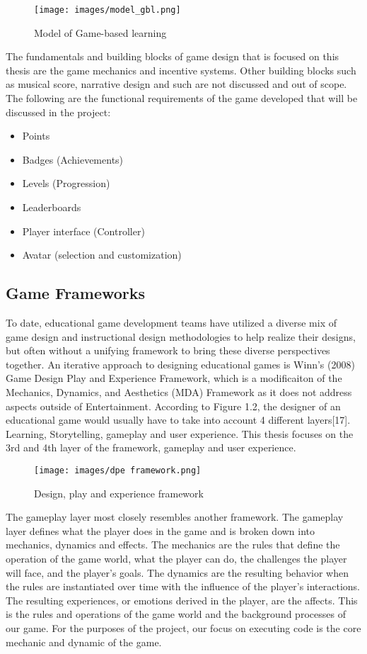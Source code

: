 \begin{figure}[H]
    \centering
    \texttt{[image: images/model\_gbl.png]}
    \caption{Model of Game-based learning}
    \label{fig:model_GBL}
\end{figure}
The fundamentals and building blocks of game design that is focused on this thesis are the game mechanics and incentive systems. Other building blocks such as musical score, narrative design and such are not discussed and out of scope. The following are the functional requirements of the game developed that will be discussed in the project:
\begin{itemize}
    \item Points
    \item Badges (Achievements)
    \item Levels (Progression)
    \item Leaderboards
    \item Player interface (Controller)
    \item Avatar (selection and customization)
\end{itemize}

\subsection{Game Frameworks}
To date, educational game development teams have utilized a diverse mix of game design and instructional design methodologies to help realize their designs, but often without a unifying framework to bring these diverse perspectives together. An iterative approach to designing educational games is Winn's (2008) Game Design Play and Experience Framework, which is a modificaiton of the Mechanics, Dynamics, and Aesthetics (MDA) Framework as it does not address aspects outside of Entertainment. According to Figure 1.2, the designer of an educational game would usually have to take into account 4 different layers[17]. Learning, Storytelling, gameplay and user experience. This thesis focuses on the 3rd and 4th layer of the framework, gameplay and user experience.

\begin{figure}[H]
    \centering
    \texttt{[image: images/dpe framework.png]}
    \caption{Design, play and experience framework}
\end{figure}


The gameplay layer most closely resembles another framework. The gameplay layer defines what the player does in the game and is broken down into mechanics, dynamics and effects. The mechanics are the rules that define the operation of the game world, what the player can do, the challenges the player will face, and the player's goals. The dynamics are the resulting behavior when the rules are instantiated over time with the influence of the
player's interactions. The resulting experiences, or emotions derived in the player, are the affects. This is the rules and operations of the game world and the background processes of our game. For the purposes of the project, our focus on executing code is the core mechanic and dynamic of the game.

